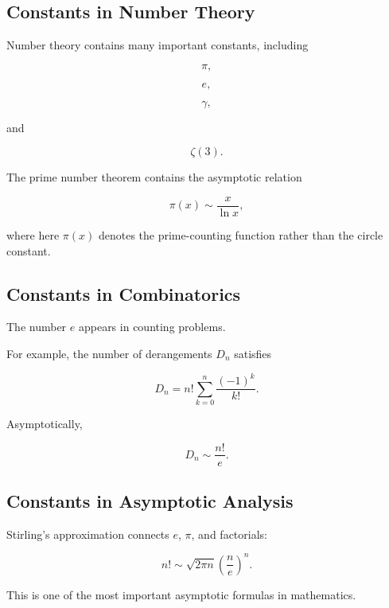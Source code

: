 \subsection{Constants in Number Theory}
\label{subsec:constants-in-number-theory}

Number theory contains many important constants, including

\[
\boxed{
\pi,
}
\]

\[
\boxed{
e,
}
\]

\[
\boxed{
\gamma,
}
\]

and

\[
\boxed{
\zeta(3).
}
\]

The prime number theorem contains the asymptotic relation

\[
\boxed{
\pi(x)
\sim
\frac{x}{\ln x},
}
\]

where here \(\pi(x)\) denotes the prime-counting function rather than the
circle constant.

\subsection{Constants in Combinatorics}
\label{subsec:constants-in-combinatorics}

The number \(e\) appears in counting problems.

For example, the number of derangements \(D_n\) satisfies

\[
\boxed{
D_n
=
n!
\sum_{k=0}^{n}
\frac{(-1)^k}{k!}.
}
\]

Asymptotically,

\[
\boxed{
D_n
\sim
\frac{n!}{e}.
}
\]

\subsection{Constants in Asymptotic Analysis}
\label{subsec:constants-in-asymptotic-analysis}

Stirling's approximation connects \(e\), \(\pi\), and factorials:

\[
\boxed{
n!
\sim
\sqrt{2\pi n}
\left(
\frac{n}{e}
\right)^n.
}
\]

This is one of the most important asymptotic formulas in mathematics.


